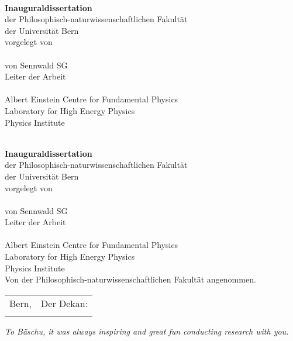 \begin{titlepage}
	\begin{center}
		\null
		\vfill
		\textbf{\LARGE\Title}\\[20mm]
		\textbf{\large Inauguraldissertation}\\
		{\large der Philosophisch-naturwissenschaftlichen Fakultät}\\
		{\large der Universität Bern}\\[20mm]
		{\large vorgelegt von}\\[10mm]
		\textbf{\Large\Author}\\[10mm]
		{\large von Sennwald SG}\\[20mm]
		{\large Leiter der Arbeit}\\
		\textbf{\large\Supervisor}\\[10mm]
		{\large Albert Einstein Centre for Fundamental Physics}\\
		{\large Laboratory for High Energy Physics}\\
		{\large Physics Institute}\\
		\vfill
	\end{center}
	\clearpage
	\null
	\clearpage
	\begin{center}
		\null
		\vfill
		\textbf{\LARGE\Title}\\[20mm]
		\textbf{\large Inauguraldissertation}\\
		{\large der Philosophisch-naturwissenschaftlichen Fakultät}\\
		{\large der Universität Bern}\\[20mm]
		{\large vorgelegt von}\\[10mm]
		\textbf{\Large\Author}\\[10mm]
		{\large von Sennwald SG}\\[20mm]
		{\large Leiter der Arbeit}\\
		\textbf{\large\Supervisor}\\[10mm]
		{\large Albert Einstein Centre for Fundamental Physics}\\
		{\large Laboratory for High Energy Physics}\\
		{\large Physics Institute}\\[10mm]
		{\large Von der Philosophisch-naturwissenschaftlichen Fakultät angenommen.}\\[10mm]
		\begin{tabu} to \textwidth {Xl}
			{\large Bern, \Date} &	{\large Der Dekan:} \\
			&						{\large\Dean}
		\end{tabu}
		\vfill
	\end{center}
	\clearpage
\end{titlepage}


\null
\vfill
\emph{To Bäschu, it was always inspiring and great fun conducting research with you.}
\vfill
\clearpage
